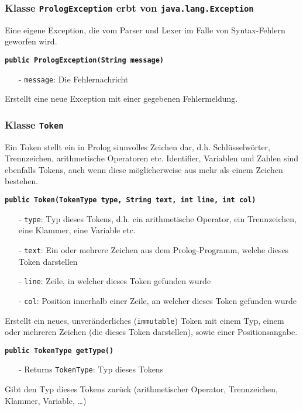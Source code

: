\documentclass[parskip=full,11pt,twoside]{scrartcl}
\begin{document}
\subsubsection{Klasse \texttt{PrologException} erbt von \texttt{java.lang.Exception}}

Eine eigene Exception, die vom Parser und Lexer im Falle von Syntax-Fehlern geworfen wird.

\textbf{\texttt{public PrologException(String message)}}
\begin{itemize}[noitemsep]
	\item[-] \texttt{message}: Die Fehlernachricht
\end{itemize}
Erstellt eine neue Exception mit einer gegebenen Fehlermeldung.

\subsubsection{Klasse \texttt{Token}}

Ein Token stellt ein in Prolog sinnvolles Zeichen dar, d.h. Schlüsselwörter, Trennzeichen, arithmetische Operatoren etc. Identifier, Variablen und Zahlen sind ebenfalls Tokens, auch wenn diese möglicherweise aus mehr als einem Zeichen bestehen.

\textbf{\texttt{public Token(TokenType type, String text, int line, int col)}}
\begin{itemize}[noitemsep]
	\item[-] \texttt{type}: Typ dieses Tokens, d.h. ein arithmetische Operator, ein Trennzeichen, eine Klammer, eine Variable etc.
	\item[-] \texttt{text}: Ein oder mehrere Zeichen aus dem Prolog-Programm, welche dieses Token darstellen
	\item[-] \texttt{line}: Zeile, in welcher dieses Token gefunden wurde
	\item[-] \texttt{col}: Position innerhalb einer Zeile, an welcher dieses Token gefunden wurde
\end{itemize}
Erstellt ein neues, unveränderliches (\texttt{immutable}) Token mit einem Typ, einem oder mehreren Zeichen (die dieses Token darstellen), sowie einer Positionsangabe.

\textbf{\texttt{public TokenType getType()}}
\begin{itemize}[noitemsep]
	\item[-] Returns \texttt{TokenType}: Typ dieses Tokens
\end{itemize}
Gibt den Typ dieses Tokens zurück (arithmetischer Operator, Trennzeichen, Klammer, Variable, \dots)
\end{document}
